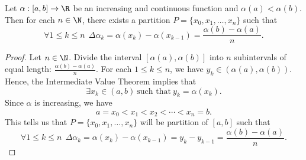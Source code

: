 \begin{lemma}\label{lemma 2}
    Let \( \alpha:[a,b] \to \R  \) be an increasing and continuous function and \( \alpha(a) < \alpha(b) \). Then for each \( n \in \N \), there exists a partition \( P = \{  {x}_{0}, {x}_{1}, \dots, {x}_{n} \}  \) such that   
    \[  \forall 1 \leq k \leq n \ \ \Delta \alpha_k = \alpha({x}_{k}) - \alpha({x}_{k-1}) = \frac{ \alpha(b) - \alpha(a) }{  n  }. \]
\end{lemma}
\begin{proof}
    Let \( n \in \N \). Divide the interval \( [\alpha(a), \alpha(b)] \) into \( n  \) subintervals of equal length: \( \frac{ \alpha(b) - \alpha(a) }{ n  }  \). For each \( 1 \leq k \leq n  \), we have \( {y}_{k } \in (\alpha(a), \alpha(b)) \). Hence, the Intermediate Value Theorem implies that 
    \[  \exists {x}_{k } \in (a,b) \ \text{such that} \ {y}_{k } = \alpha({x}_{k}). \]
    Since \( \alpha  \) is increasing, we have 
    \[  a = {x}_{0} < {x}_{1} < {x}_{2} < \cdots < {x}_{n} = b.   \]
    This tells us that \( P = \{  {x}_{0},{x}_{1}, \dots, {x}_{n} \}  \) will be partition of \( [a,b] \) such that
    \[  \forall 1 \leq k \leq n  \ \ \Delta {\alpha}_{k } = \alpha({x}_{k}) - \alpha({x}_{k-1}) = {y}_{k } - {y}_{k-1} = \frac{ \alpha(b) - \alpha(a) }{ n }. \]
\end{proof}





